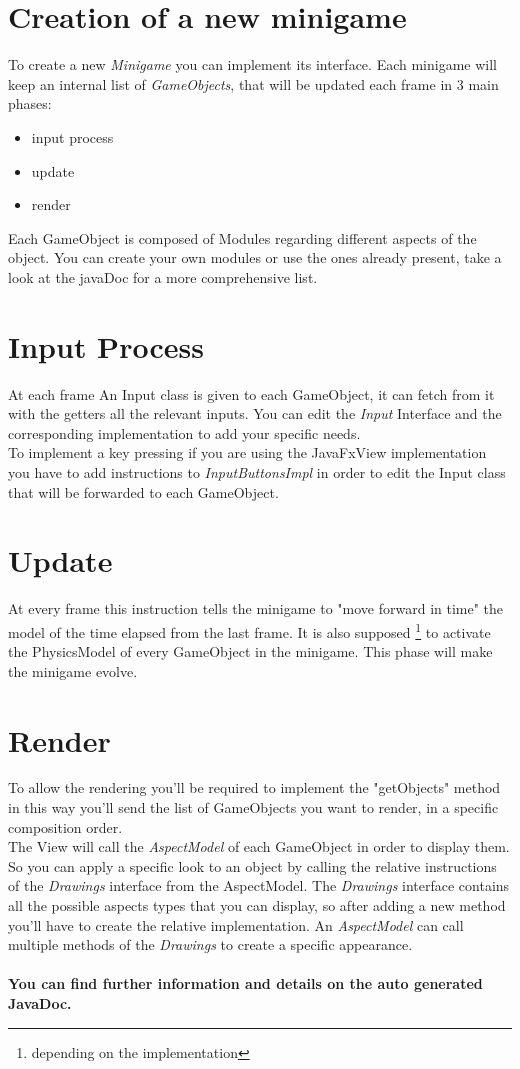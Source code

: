 \documentclass[a4paper,12pt]{report}
\begin{document}
\section*{Creation of a new minigame}
To create a new \textit{Minigame} you can implement its interface.
Each minigame will keep an internal list of \textit{GameObjects}, that will be updated each frame in 3 main phases:
\begin{itemize}
	\item input process
	\item update
	\item render
\end{itemize}
Each GameObject is composed of Modules regarding different aspects of the object.
You can create your own modules or use the ones already present, take a look at the javaDoc for a more comprehensive list.
\section*{Input Process}
At each frame An Input class is given to each GameObject, it can fetch from it with the getters all the relevant inputs.
You can edit the \textit{Input} Interface and the corresponding implementation to add your specific needs.\\
To implement a key pressing if you are using the JavaFxView implementation you have to add instructions to \textit{InputButtonsImpl} in order to edit the Input class that will be forwarded to each GameObject.

\section*{Update}
At every frame this instruction tells the minigame to "move forward in time" the model of the time elapsed from the last frame. It is also supposed \footnote{depending on the implementation} to activate the PhysicsModel of every GameObject in the minigame.
This phase will make the minigame evolve.
\section*{Render}
To allow the rendering you'll be required to implement the "getObjects" method in this way you'll send the list of GameObjects you want to render, in a specific composition order.\\
The View will call the \textit{AspectModel} of each GameObject in order to display them.\\
So you can apply a specific look to an object by calling the relative instructions of the \textit{Drawings} interface from the AspectModel.
The \textit{Drawings} interface contains all the possible aspects types that you can display, so after adding a new method you'll have to create the relative implementation.
An \textit{AspectModel} can call multiple methods of the \textit{Drawings} to create a specific appearance.
\\\\
\textbf{You can find further information and details on the auto generated JavaDoc.}
\end{document}
